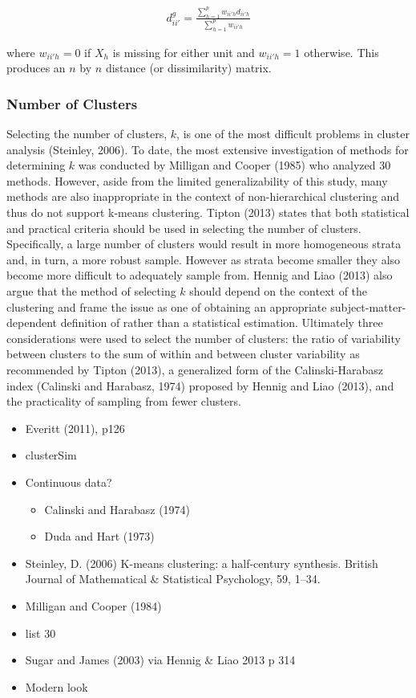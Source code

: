 \documentclass[floatsintext,man]{apa6}
\providecommand{\tightlist}{%
  \setlength{\itemsep}{0pt}\setlength{\parskip}{0pt}}
\theoremstyle{definition}
\theoremstyle{definition}
\theoremstyle{definition}
\theoremstyle{remark}
\begin{document}
\begin{align}
  d^{g}_{ii'} = \frac{\sum^p_{h = 1}w_{ii'h}d_{ii'h}}{\sum^p_{h = 1}w_{ii'h}}
\end{align}

where \(w_{ii'h} = 0\) if \(X_h\) is missing for either unit and
\(w_{ii'h} = 1\) otherwise. This produces an \(n\) by \(n\) distance (or
dissimilarity) matrix.

\subsubsection{Number of Clusters}\label{number-of-clusters}

Selecting the number of clusters, \(k\), is one of the most difficult
problems in cluster analysis (Steinley, 2006). To date, the most
extensive investigation of methods for determining \(k\) was conducted
by Milligan and Cooper (1985) who analyzed 30 methods. However, aside
from the limited generalizability of this study, many methods are also
inappropriate in the context of non-hierarchical clustering and thus do
not support k-means clustering. Tipton (2013) states that both
statistical and practical criteria should be used in selecting the
number of clusters. Specifically, a large number of clusters would
result in more homogeneous strata and, in turn, a more robust sample.
However as strata become smaller they also become more difficult to
adequately sample from. Hennig and Liao (2013) also argue that the
method of selecting \(k\) should depend on the context of the clustering
and frame the issue as one of obtaining an appropriate
subject-matter-dependent definition of rather than a statistical
estimation. Ultimately three considerations were used to select the
number of clusters: the ratio of variability between clusters to the sum
of within and between cluster variability as recommended by Tipton
(2013), a generalized form of the Calinski-Harabasz index (Calinski and
Harabasz, 1974) proposed by Hennig and Liao (2013), and the practicality
of sampling from fewer clusters.

\begin{itemize}
\item
  Everitt (2011), p126
\item
  clusterSim
\item
  Continuous data?

  \begin{itemize}
  \tightlist
  \item
    Calinski and Harabasz (1974)
  \item
    Duda and Hart (1973)
  \end{itemize}
\item
  Steinley, D. (2006) K-means clustering: a half-century synthesis.
  British Journal of Mathematical \& Statistical Psychology, 59, 1--34.
\item
  Milligan and Cooper (1984)
\item
  list 30
\item
  Sugar and James (2003) via Hennig \& Liao 2013 p 314
\item
  Modern look
\end{itemize}
\end{document}
